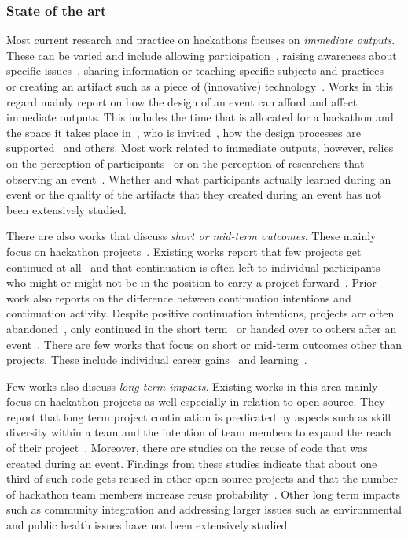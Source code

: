 \documentclass{ieeeaccess}
\begin{document}
\subsubsection{State of the art}
Most current research and practice on hackathons focuses on \textit{immediate outputs}. 
These can be varied and include allowing participation~\cite{taylor2018everybody}, raising awareness about specific issues~\cite{hope2019hackathons}, sharing information or teaching specific subjects and practices~\cite{huppenkothen2018hack,cameron2016brainhack} or creating an artifact such as a piece of (innovative) technology~\cite{nolte2018you}. 
Works in this regard mainly report on how the design of an event can afford and affect immediate outputs. 
This includes the time that is allocated for a hackathon and the space it takes place in~\cite{trainer2016hackathon}, who is invited~\cite{cobham2017appfest}, how the design processes are supported~\cite{gama2022developers,olesen2018four} and others. 
Most work related to immediate outputs, however, relies on the perception of participants~\cite{nolte2020support} or on the perception of researchers that observing an event~\cite{pe2019understanding}. 
Whether and what participants actually learned during an event or the quality of the artifacts that they created during an event has not been extensively studied.

There are also works that discuss \textit{short or mid-term outcomes}. 
These mainly focus on hackathon projects~\cite{mcintosh2021hackathon,nolte2020happens}. 
Existing works report that few projects get continued at all~\cite{nolte2020happens,carruthers2014open} and that continuation is often left to individual participants who might or might not be in the position to carry a project forward~\cite{leemet2021utilizing,nolte2018you}. 
Prior work also reports on the difference between continuation intentions and continuation activity. 
Despite positive continuation intentions, projects are often abandoned~\cite{carruthers2014open}, only continued in the short term~\cite{nolte2020happens} or handed over to others after an event~\cite{pe2022corporate,nolte2018you}. 
There are few works that focus on short or mid-term outcomes other than projects. 
These include individual career gains~\cite{pe2022corporate,nolte2018you} and learning~\cite{porras2018hackathons}.

Few works also discuss \textit{long term impacts}. 
Existing works in this area mainly focus on hackathon projects as well especially in relation to open source. 
They report that long term project continuation is predicated by aspects such as skill diversity within a team and the intention of team members to expand the reach of their project~\cite{nolte2020happens}. 
Moreover, there are studies on the reuse of code that was created during an event. 
Findings from these studies indicate that about one third of such code gets reused in other open source projects and that the number of hackathon team members increase reuse probability~\cite{mahmoud2022one}. 
Other long term impacts such as community integration and addressing larger issues such as environmental and public health issues have not been extensively studied.
\end{document}
